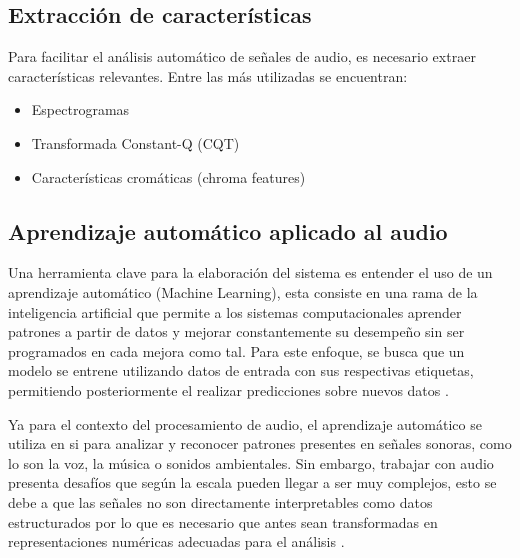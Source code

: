 \subsection{Extracción de características}

Para facilitar el análisis automático de señales de audio, es necesario extraer características relevantes. Entre las más utilizadas se encuentran:

\begin{itemize}
\item Espectrogramas
\item Transformada Constant-Q (CQT)
\item Características cromáticas (chroma features)
\end{itemize}

\subsection{Aprendizaje automático aplicado al audio}
Una herramienta clave para la elaboración del sistema es entender el uso de un aprendizaje automático (Machine Learning), esta consiste en una rama de la inteligencia artificial que permite a los sistemas computacionales aprender patrones a partir de datos y mejorar constantemente su desempeño sin ser programados en cada mejora como tal. Para este enfoque, se busca que un modelo se entrene utilizando datos de entrada con sus respectivas etiquetas, permitiendo posteriormente el realizar predicciones sobre nuevos datos \cite{jamshidi2024machine}.


Ya para el contexto del procesamiento de audio, el aprendizaje automático se utiliza en si para analizar y reconocer patrones presentes en señales sonoras, como lo son la voz, la música o sonidos ambientales. Sin embargo, trabajar con audio presenta desafíos que según la escala pueden llegar a ser muy complejos, esto se debe a que las señales no son directamente interpretables como datos estructurados por lo que es necesario que antes sean transformadas en representaciones numéricas adecuadas para el análisis \cite{roman2020data}.